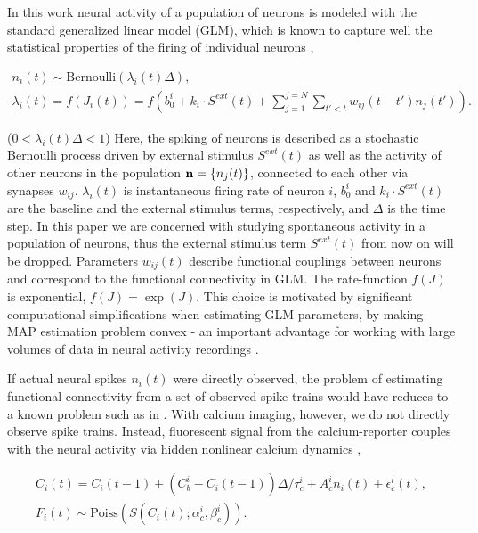In this work neural activity of a population of neurons is modeled with the standard generalized linear model (GLM), which is known to capture well the statistical properties of the firing of individual neurons \cite{PILL07, PAN03d, Wu07, Rigat06, OKA05}, 

\begin{equation}\label{eqn:glm:definition}
\begin{array}{l}
n_i(t)\sim \text{Bernoulli}(\lambda_i(t)\Delta), \\
\lambda_i(t)=f(J_i(t))=f(b_0^i+k_i\cdot S^{ext}(t)+\sum\limits_{j=1}^{j=N} \sum\limits_{t'<t} w_{ij}(t-t')n_{j}(t')).
\end{array}
\end{equation}

($ 0 < \lambda_i(t)\Delta<1$)
Here, the spiking of neurons is described as a stochastic Bernoulli process driven by external stimulus $S^{ext}(t)$ as well as the activity of other neurons in the population ${\bf n}=\{n_{j}(t)\}$, connected to each other via synapses $w_{ij}$.  $\lambda_i(t)$ is instantaneous firing rate of neuron $i$, $b_0^i$ and $k_i\cdot S^{ext}(t)$ are the baseline and the external stimulus terms, respectively, and $\Delta$ is the time step.  In this paper we are concerned with studying spontaneous activity in a population of neurons, thus the external stimulus term $S^{ext}(t)$ from now on will be dropped.  Parameters $w_{ij}(t)$ describe functional couplings between neurons and correspond to the functional connectivity in GLM.  The rate-function $f(J)$ is exponential, $f(J)=\exp(J)$.  This choice is motivated by significant computational simplifications when estimating GLM parameters, by making MAP estimation problem convex - an important advantage for working with large volumes of data
in neural activity recordings \cite{PAN03d}.

If actual neural spikes $n_i(t)$ were directly observed, the problem of estimating functional connectivity from a set of observed spike trains would have reduces to a known problem such as in \cite{PILL07}. With calcium imaging, however, we do not directly observe spike trains. Instead, fluorescent signal from the calcium-reporter couples with the neural activity via hidden nonlinear calcium dynamics \cite{Vogelstein2009}, 

\begin{equation}\label{eqn:ca:definition}
\begin{array}{l}
C_i(t) = C_i(t-1) + (C^i_b-C_i(t-1)) \Delta/\tau^i_c + A^i_c n_i(t)+\epsilon_c^i(t), \\
F_i(t) \sim \text{Poiss}( S(C_i(t);\alpha^i_c, \beta^i_c) ).
\end{array}
\end{equation}

